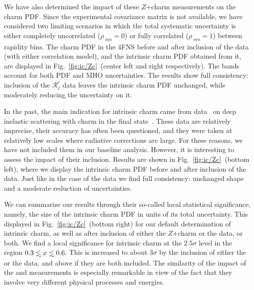  We have also determined the impact of these \lhcb $Z$+charm measurements on the
charm PDF.
%
Since the experimental covariance matrix is not available,
we have considered two limiting scenarios in which the total
systematic uncertainty is either completely uncorrelated 
($\rho_\textrm{ sys}=0$) or fully correlated  ($\rho_\textrm{ sys}=1$) between
 rapidity bins. The charm PDF in the 4FNS before and after
inclusion of the \lhcb data (with either correlation model), and the intrinsic
charm PDF obtained from it, are displayed in
Fig.~\ref{fig:ic/Zc}~(center left and right respectively).
%
The bands account for both PDF and MHO uncertainties.
%
The results show full consistency: inclusion of the \lhcb  $\mathcal{R}_j^c$ data leaves
the intrinsic charm PDF unchanged, while moderately reducing the
uncertainty on it.

In the past, the main indication for  intrinsic charm came from \emc data~\cite{Aubert:1982tt} on deep inelastic scattering with charm in the final state~\cite{Harris:1995jx}.
%
These data are relatively imprecise, their accuracy has often been questioned,
and they were taken at relatively low scales where radiative corrections are large.
%
For these reasons, we have not included them in our baseline
analysis.
%
However, it is interesting to assess the impact of
their inclusion.
%
Results are shown in 
Fig.~\ref{fig:ic/Zc}~(bottom left), where we display the
intrinsic charm PDF before and after inclusion of the \emc data.
%
Just
like in the case of the \lhcb data we find full consistency: unchanged
shape and a moderate reduction of uncertainties.

We can summarize our results  through their so-called local statistical
significance, namely, the size of the intrinsic charm PDF
in units of its total uncertainty.
%
This displayed  in Fig.~\ref{fig:ic/Zc}~(bottom right) for our default determination of
intrinsic charm, as well as after inclusion of either the \lhcb $Z$+charm or the
\emc data, or both.
%
We find a local significance for intrinsic charm at the $2.5\sigma$ level
in the region $0.3 \lsim x \lsim 0.6$.
%
This is increased to about
$3\sigma$ by the inclusion of either the \emc or the \lhcb
data, and above if they are both included.
%
The similarity of the impact of the \emc and \lhcb measurements is
especially remarkable in view of the fact that they involve very
different physical processes and energies.
